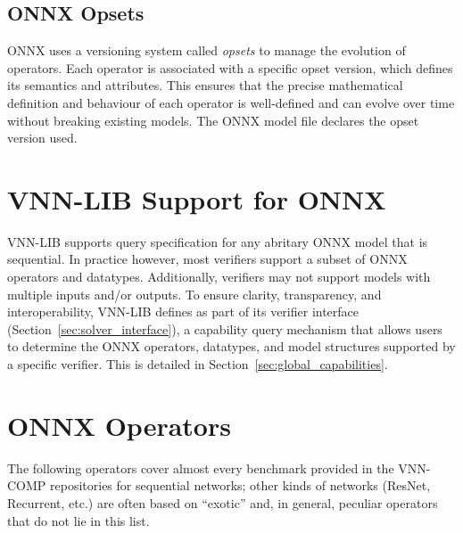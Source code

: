 \subsection{ONNX Opsets}
ONNX uses a versioning system called \emph{opsets} to manage the evolution of operators. Each operator is associated with a specific opset version, which defines its semantics and attributes.
This ensures that the precise mathematical definition and behaviour of each operator is well-defined and can evolve over time without breaking existing models. The ONNX model file declares the opset
version used.
	
\section{VNN-LIB Support for ONNX}
\label{sec:onnx_support}
VNN-LIB supports query specification for any abritary ONNX model that is sequential. In practice however, most verifiers support a subset of ONNX operators and datatypes. Additionally, verifiers may not support
models with multiple inputs and/or outputs. To ensure clarity, transparency, and interoperability, VNN-LIB defines as part of its verifier interface (Section~\ref{sec:solver_interface}), a capability query 
mechanism that allows users to determine the ONNX operators, datatypes, and model structures supported by a specific verifier. This is detailed in Section~\ref{sec:global_capabilities}.

\section{ONNX Operators}
\label{sec:supported_operators}
The following operators cover almost every benchmark provided in the
VNN-COMP repositories for sequential networks; other kinds of networks
(ResNet, Recurrent, etc.) are often based on ``exotic'' and, in general,
peculiar operators that do not lie in this list.

